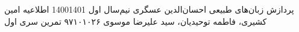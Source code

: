 \documentclass[a4paper,12pt]{article}
\begin{document}
\handout
{پردازش زبان‌های طبیعی}
{احسان‌الدین عسگری}
{نیم‌سال اول 1400\lr{-}1401}
{اطلاعیه}
{امین کشیری، فاطمه توحیدیان، سید علیرضا موسوی}
{۹۷۱۰۱۰۲۶}
 {تمرین سری اول}
\end{document}
